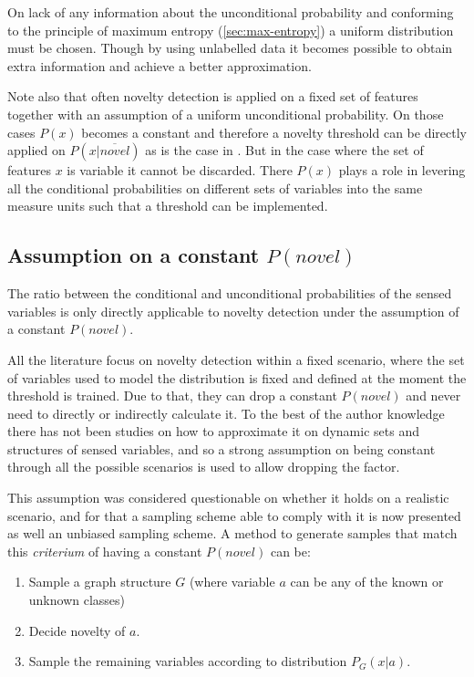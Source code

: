 On lack of any information about the unconditional probability and conforming to
the principle of maximum entropy (\autoref{sec:max-entropy}) a uniform
distribution must be chosen.
Though by using unlabelled data it becomes possible to obtain extra information
and achieve a better approximation.


Note also that often novelty detection is applied on a fixed set of features
together with an assumption of a uniform unconditional probability.
On those cases $P(x)$ becomes a constant and therefore a novelty threshold
can be directly applied on $P(x|\overline{novel})$ as is the case in \cite{bishop1994novelty}.
But in the case where the set of features $x$ is variable it cannot be
discarded. There $P(x)$ plays a role in levering all the conditional
probabilities on different sets of variables into the same measure units
such that a threshold can be implemented.

\subsection{Assumption on a constant $P(novel)$}
The ratio between the conditional and unconditional probabilities of the sensed variables
is only directly applicable to novelty detection under the assumption of a constant $P(novel)$.

All the literature focus on novelty detection within a fixed scenario, where the set of variables
used to model the distribution is fixed and defined at the moment the threshold is trained.
Due to that, they can drop a constant $P(novel)$ and never need to directly or indirectly calculate
it.
To the best of the author knowledge there has not been studies on how to approximate it on dynamic
sets and structures of sensed variables, and so a strong assumption on being constant through all
the possible scenarios is used to allow dropping the factor.

This assumption was considered questionable on whether it holds on a realistic scenario,
and for that a sampling scheme able to comply with it is now presented as well an unbiased sampling
scheme. A method to generate samples that match this \emph{criterium} of having a constant $P(novel)$ can be:

\begin{algorithm}
\begin{enumerate}
\item Sample a graph structure $G$ (where variable $a$ can be any of the known or unknown classes)
\item Decide novelty of $a$.
\item Sample the remaining variables according to distribution $P_G(x|a)$.
\end{enumerate}
\end{algorithm}

